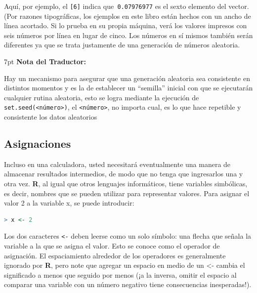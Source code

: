 \documentclass[spanish]{extbook}
\newenvironment{tradnote}{%
  \def\FrameCommand{%
    \hspace{1pt}%
    {\color{darkblue}\vrule width 2pt}%
    {\color{formalshade}\vrule width 4pt}%
    \colorbox{formalshade}%
  }%
  \vspace{12pt}
  \MakeFramed{\advance\hsize-\width\FrameRestore}%
  \noindent\hspace{-4.55pt}%
  \begin{adjustwidth}{}{7pt}%
  \vspace{1pt}%
  \textbf{Nota del Traductor:\\}%
}
{%
  \vspace{6pt}\end{adjustwidth}\endMakeFramed%
}
\numberwithin{equation}{section}
\numberwithin{figure}{section}
\begin{document}
Aquí, por ejemplo, el \texttt{{[}6{]}} indica que\texttt{ 0.07976977}
es el sexto elemento del vector. (Por razones tipográficas, los ejemplos
en este libro están hechos con un ancho de línea acortado. Si lo prueba
en su propia máquina, verá los valores impresos con seis números por
línea en lugar de cinco. Los números en sí mismos también serán diferentes
ya que se trata justamente de una generación de números aleatoria.

\begin{tradnote}

	Hay un mecanismo para asegurar que una generación aleatoria sea consistente
	en distintos momentos y es la de establecer un ``semilla'' inicial con que
	se ejecutarán cualquier rutina aleatoria, esto se logra mediante la
	ejecución de \texttt{set.seed(<número>)}, el \texttt{<número>}, no importa
	cual, es lo que hace repetible y consistente los datos aleatorios

\end{tradnote} 

\subsection{Asignaciones}

Incluso en una calculadora, usted necesitará eventualmente una manera de
almacenar resultados intermedios, de modo que no tenga que ingresarlos una y
otra vez. \textbf{R}, al igual que otros lenguajes informáticos, tiene
variables simbólicas, es decir, nombres que se pueden utilizar para representar
valores. Para asignar el valor 2 a la variable x, se puede introducir:

\begin{lstlisting}[language=R]
> x <- 2
\end{lstlisting}


Los dos caracteres \texttt{<-} deben leerse como un solo símbolo: una flecha
que señala la variable a la que se asigna el valor. Esto se conoce como el
operador de asignación. El espaciamiento alrededor de los operadores es
generalmente ignorado por \textbf{R}, pero note que agregar un espacio en medio
de un <- cambia el significado a \textquotedbl{}menos que\textquotedbl{}
seguido por \textquotedbl{}menos\textquotedbl{} (¡a la inversa, omitir el
espacio al comparar una variable con un número negativo tiene consecuencias
inesperadas!). 
\end{document}
